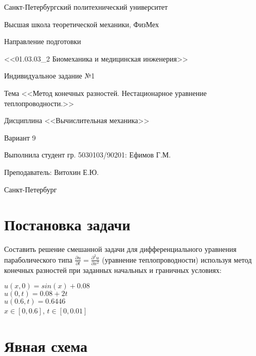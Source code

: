 \documentclass[a4paper]{article}
\begin{document}
 
\begin{titlepage}

\thispagestyle{empty}

\centerline{Санкт-Петербургский политехнический университет}
\centerline{Высшая школа теоретической механики, ФизМех}

\vfill
\centerline{Направление подготовки}
\centerline{<<01.03.03\_2 Биомеханика и медицинская инженерия>>}

\vfill

\centerline{Индивидуальное задание №1}
\begin{center}
    Тема <<Метод конечных разностей. Нестационарное уравнение\\ теплопроводности.>>
\end{center}    
\centerline{Дисциплина <<Вычислительная механика>>}
\centerline{Вариант 9}

\vfill

Выполнила студент гр. 5030103/90201: \hfill Ефимов Г.М. 

Преподаватель: \hfill  Витохин Е.Ю.

\vfill

\centerline{Санкт-Петербург}
\centerline{\the\year}
\clearpage
\end{titlepage}

\newpage
     
    \tableofcontents
\newpage
 
\newpage
\section{Постановка задачи}
    Составить решение смешанной задачи для дифференциального уравнения параболического типа $\frac{\partial u}{\partial t} = \frac{\partial^{2} u}{\partial x^{2}}$ (уравнение теплопроводности) используя метод конечных разностей при заданных начальных и граничных условиях:\\
    \begin{center}
    $u(x,0)=sin(x)+0.08$\\
    $u(0,t)=0.08+2 t$\\
    $u(0.6,t)=0.6446$\\
    $x \in [0,0.6]$, $t \in [0,0.01]$
    \end{center}
    \newpage
\section{Явная схема}
\end{document}
